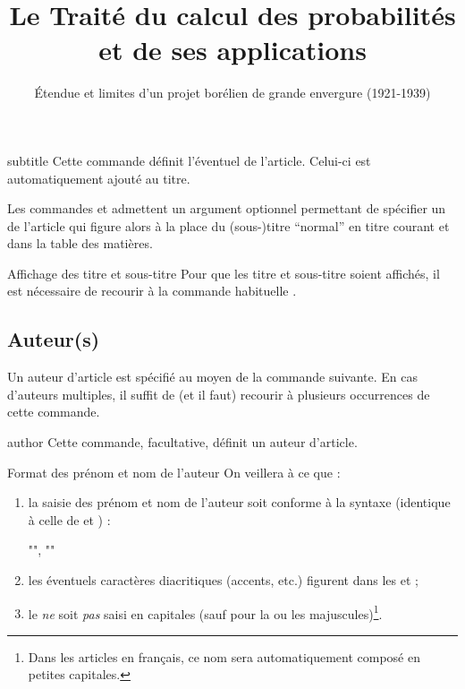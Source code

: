 \documentclass[french,nolocaltoc]{nwejmart}
\newtheorem[title=Fait,style=definition]{fact}
\begin{document}
\begin{docCommand}{subtitle}{}
  Cette commande définit l'éventuel  de l'article. Celui-ci
  est automatiquement ajouté au titre.
\end{docCommand}

Les commandes  et  admettent un argument
optionnel permettant de spécifier un  de l'article qui
figure alors à la place du (sous-)titre \enquote{normal} en titre courant et
dans la table des matières.

\begin{bodycode}
\title[Le Traité du calcul des probabilités]{Le Traité du calcul des
  probabilités et de ses applications}
\subtitle[Étendue et limites d'un projet borélien]{Étendue et limites
  d'un projet borélien de grande envergure (1921-1939)}
\end{bodycode}

\begin{dbremark}{Affichage des titre et sous-titre}{}
  Pour que les titre et sous-titre soient affichés, il est nécessaire de
  recourir à la commande habituelle .
\end{dbremark}

\subsection{Auteur(s)}
\label{sec-auteurs}

Un auteur d'article est spécifié au moyen de la commande 
suivante. En cas d'auteurs multiples, il suffit de (et il faut) recourir
à plusieurs occurrences de cette commande.

\begin{docCommand}{author}{}
  Cette commande, facultative, définit un auteur d'article.
\end{docCommand}
%
\begin{dbwarning}{Format des prénom et nom de l'auteur}{}
  On veillera à ce que :
  \begin{enumerate}
  \item la saisie des prénom et nom de l'auteur soit conforme à la syntaxe
    (identique à celle de  et ) :
\begin{bodycode}[listing options={showspaces}]
"", ""
\end{bodycode}
  \item les éventuels caractères diacritiques (accents, etc.) figurent dans les
     et  ;
  \item le  \emph{ne} soit \emph{pas} saisi en capitales (sauf pour la
    ou les majuscules)\footnote{Dans les articles en français, ce nom sera
      automatiquement composé en petites capitales.}.
  \end{enumerate}
\end{dbwarning}
\end{document}
